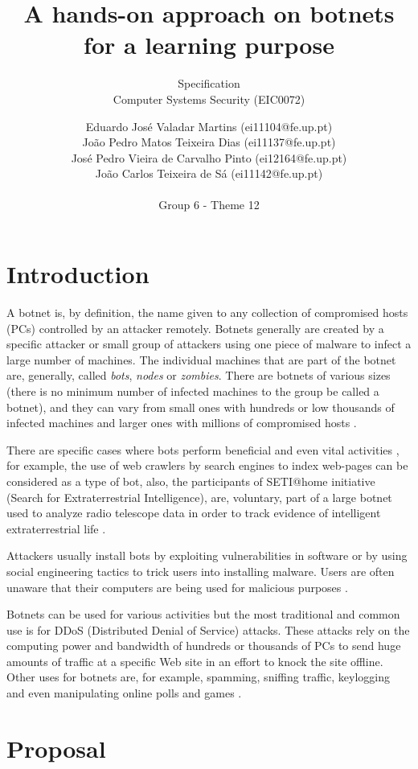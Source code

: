 \documentclass[]{article}
\title{A hands-on approach on botnets for a learning purpose\\}
\subtitle{Specification\\\vspace{10px}
	Computer Systems Security (EIC0072)
}
\author{Eduardo José Valadar Martins (ei11104@fe.up.pt)\\
	João Pedro Matos Teixeira Dias (ei11137@fe.up.pt)\\
	José Pedro Vieira de Carvalho Pinto (ei12164@fe.up.pt)\\
	João Carlos Teixeira de Sá (ei11142@fe.up.pt)\\\\Group 6 - Theme 12\\
}
\begin{document}
\maketitle
\thispagestyle{empty}
\newpage

\tableofcontents
\newpage
\section{Introduction}

A botnet is, by definition, the name given to any collection of compromised hosts (PCs) controlled by an attacker remotely. Botnets generally are created by a specific attacker or small group of attackers using one piece of malware to infect a large number of machines. The individual machines that are part of the botnet are, generally, called \textit{bots}, \textit{nodes} or \textit{zombies}. There are botnets of various sizes (there is no minimum number of infected machines to the group be called a botnet), and they can vary from small ones with hundreds or low thousands of infected machines and larger ones with millions of compromised hosts \cite{website:botnet-def}.

There are specific cases where bots perform beneficial and even vital activities \cite{website:botnet-useful}, for example, the use of web crawlers by search engines to index web-pages can be considered as a type of bot, also, the participants of SETI@home initiative (Search for Extraterrestrial Intelligence), are, voluntary, part of a large botnet used to analyze radio telescope data in order to track evidence of intelligent extraterrestrial life \cite{website:setihome}.

Attackers usually install bots by exploiting vulnerabilities in software or by using social engineering tactics to trick users into installing malware. Users are often unaware that their computers are being used for malicious purposes \cite{website:botnet-useful}.

Botnets can be used for various activities but the most traditional and common use is for DDoS (Distributed Denial of Service) attacks. These attacks rely on the computing power and bandwidth of hundreds or thousands of PCs to send huge amounts of traffic at a specific Web site in an effort to knock the site offline. Other uses for botnets are, for example, spamming, sniffing traffic, keylogging and even manipulating online polls and games \cite{article:honeypot-tracking}. 



\section{Proposal}
\end{document}

